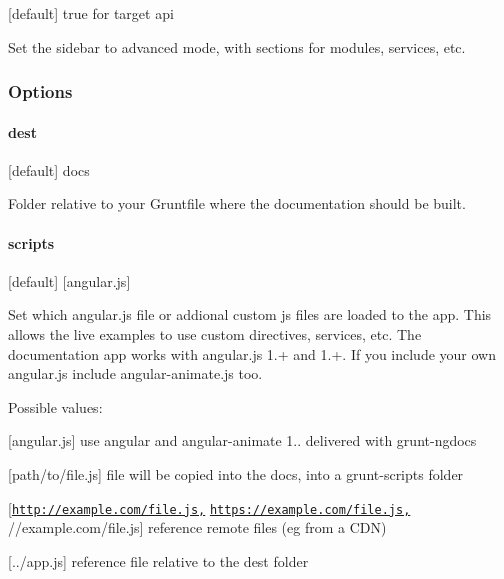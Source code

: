 \mbox{[}default\mbox{]} true for target api

Set the sidebar to advanced mode, with sections for modules, services, etc.

\subsubsection*{Options}

\paragraph*{dest}

\mbox{[}default\mbox{]} \textquotesingle{}docs\textquotesingle{}

Folder relative to your Gruntfile where the documentation should be built.

\paragraph*{scripts}

\mbox{[}default\mbox{]} \mbox{[}\textquotesingle{}angular.\+js\textquotesingle{}\mbox{]}

Set which angular.\+js file or addional custom js files are loaded to the app. This allows the live examples to use custom directives, services, etc. The documentation app works with angular.\+js 1.+ and 1.+. If you include your own angular.\+js include angular-\/animate.\+js too.

Possible values\+:


\begin{DoxyItemize}
\item \mbox{[}\textquotesingle{}angular.\+js\textquotesingle{}\mbox{]} use angular and angular-\/animate 1.. delivered with grunt-\/ngdocs
\item \mbox{[}\textquotesingle{}path/to/file.\+js\textquotesingle{}\mbox{]} file will be copied into the docs, into a {\ttfamily grunt-\/scripts} folder
\item \mbox{[}\textquotesingle{}\href{http://example.com/file.js',}{\tt http\+://example.\+com/file.\+js\textquotesingle{},} \textquotesingle{}\href{https://example.com/file.js',}{\tt https\+://example.\+com/file.\+js\textquotesingle{},} \textquotesingle{}//example.com/file.\+js\textquotesingle{}\mbox{]} reference remote files (eg from a C\+D\+N)
\item \mbox{[}\textquotesingle{}../app.js\textquotesingle{}\mbox{]} reference file relative to the dest folder
\end{DoxyItemize}

